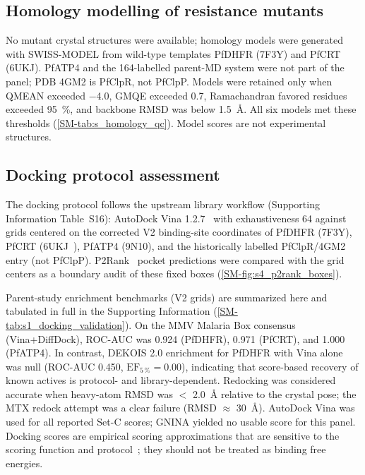\documentclass[journal=jcisd8,manuscript=article,layout=traditional]{achemso}
\begin{document}
\subsection{Homology modelling of resistance mutants}

No mutant crystal structures were available; homology models were generated with SWISS-MODEL from wild-type templates PfDHFR (7F3Y) and PfCRT (6UKJ). PfATP4 and the 164-labelled parent-MD system were not part of the panel; PDB 4GM2 is PfClpR, not PfClpP. Models were retained only when QMEAN exceeded \num{-4.0}, GMQE exceeded \num{0.7}, Ramachandran favored residues exceeded \qty{95}{\percent}, and backbone RMSD was below \qty{1.5}{\angstrom}. All six models met these thresholds (\cref{SM-tab:s_homology_qc}). Model scores are not experimental structures.

\subsection{Docking protocol assessment}

The docking protocol follows the upstream library workflow (Supporting Information Table~S16): AutoDock Vina 1.2.7~\citep{vina_2021} with exhaustiveness \num{64} against grids centered on the corrected V2 binding-site coordinates of PfDHFR (7F3Y), PfCRT (6UKJ~\citep{Kim2019PfCRT}), PfATP4 (9N10), and the historically labelled PfClpR/4GM2 entry (not PfClpP). P2Rank~\citep{Krivak2018P2Rank} pocket predictions were compared with the grid centers as a boundary audit of these fixed boxes (\cref{SM-fig:s4_p2rank_boxes}).

Parent-study enrichment benchmarks (V2 grids) are summarized here and tabulated in full in the Supporting Information (\cref{SM-tab:s1_docking_validation}). On the MMV Malaria Box consensus (Vina+DiffDock), ROC-AUC was \num{0.924} (PfDHFR), \num{0.971} (PfCRT), and \num{1.000} (PfATP4). In contrast, DEKOIS 2.0 enrichment for PfDHFR with Vina alone was null (ROC-AUC \num{0.450}, $\mathrm{EF}_{5\,\%} = \num{0.00}$), indicating that score-based recovery of known actives is protocol- and library-dependent. Redocking was considered accurate when heavy-atom RMSD was $<$ \qty{2.0}{\angstrom} relative to the crystal pose; the MTX redock attempt was a clear failure (RMSD $\approx$ \qty{30}{\angstrom}). AutoDock Vina was used for all reported Set-C scores; GNINA yielded no usable score for this panel. Docking scores are empirical scoring approximations that are sensitive to the scoring function and protocol~\citep{ferreira2023docking,sadybekov2023computational,kittelson2026docking}; they should not be treated as binding free energies.
\end{document}
